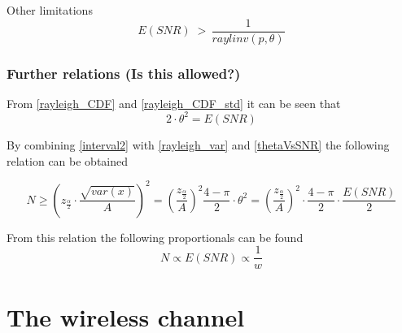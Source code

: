Other limitations
\begin{equation}
E\left(SNR\right) \;>\, \frac{1}{raylinv(p,\theta)} 
\end{equation}

\begin{where}
\end{where}




\subsection{Further relations (Is this allowed?)}


From \autoref{rayleigh_CDF} and \autoref{rayleigh_CDF_std} it can be seen that
\begin{equation}\label{thetaVsSNR}
2\cdot\theta^2 = E\left(SNR\right)
\end{equation}

By combining \autoref{interval2} with \autoref{rayleigh_var} and \autoref{thetaVsSNR} the following relation can be obtained

\begin{equation}
N \geq \left(z_{\frac{\alpha}{2}} \cdot \frac{\sqrt{var(x)}}{A} \right)^2 = \left(\frac{z_{\frac{\alpha}{2}}}{A}\right)^2 \frac{4-\pi}{2}\cdot \theta^2 = \left(\frac{z_{\frac{\alpha}{2}}}{A}\right)^2 \cdot \frac{4-\pi}{2}\cdot \frac{E\left(SNR\right)}{2}
\end{equation}

From this relation the following proportionals can be found
\begin{equation}
N \propto E\left(SNR\right)\propto \frac{1}{w}
\end{equation}
\chapter{The wireless channel}




